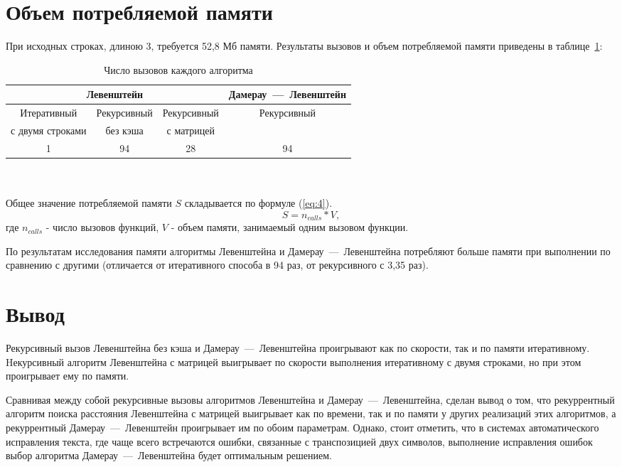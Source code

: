 \section{Объем потребляемой памяти}
При исходных строках, длиною 3, требуется 52,8 Мб памяти. Результаты вызовов и объем потребляемой памяти приведены в таблице~\ref{table:ref2}:
\begin{table}[ht!]
	\centering
	\captionsetup{singlelinecheck = false, justification=raggedright}
	\caption{Число вызовов каждого алгоритма}
	\label{table:ref2}
	\begin{tabular}{|c|c|c|c|}
		\hline
		\multicolumn{3}{|c|}{Левенштейн} & Дамерау~---~Левенштейн \\ \cline{1-3} 
		\hline
		Итеративный & Рекурсивный & Рекурсивный & \multirow{2}{*}{Рекурсивный} \\
		с двумя строками & без кэша  & с матрицей & \\
		\hline
		1 & 94 & 28 & 94 \\ 
		\hline
	\end{tabular}
\end{table}\\
\\
Общее значение потребляемой памяти $S$ складывается по формуле (\ref{eq:4}).
\begin{equation}
	S = n_{calls} * V,
	\label{eq:4}
\end{equation}
где $n_{calls}$ - число вызовов функций, $V$ - объем памяти, занимаемый одним вызовом функции.

По результатам исследования памяти алгоритмы Левенштейна и Дамерау~---~Левенштейна потребляют больше памяти при выполнении по сравнению с другими (отличается от итеративного способа в 94 раз, от рекурсивного с  3,35 раз).

\section*{Вывод}
Рекурсивный вызов Левенштейна без кэша и Дамерау~---~Левенштейна проигрывают как по скорости, так и по памяти итеративному. Hекурсивный алгоритм Левенштейна с матрицей выигрывает по скорости выполнения итеративному с двумя строками, но при этом проигрывает ему по памяти.

Сравнивая между собой рекурсивные вызовы алгоритмов Левенштейна и Дамерау~---~Левенштейна, сделан вывод о том, что рекуррентный алгоритм поиска расстояния Левенштейна с матрицей выигрывает как по времени, так и по памяти у других реализаций этих алгоритмов, а рекуррентный Дамерау~---~Левенштейн проигрывает им по обоим параметрам. Однако, стоит отметить, что в системах автоматического исправления текста, где чаще всего встречаются ошибки, связанные с транспозицией двух символов, выполнение исправления ошибок выбор алгоритма Дамерау~---~Левенштейна будет оптимальным решением.